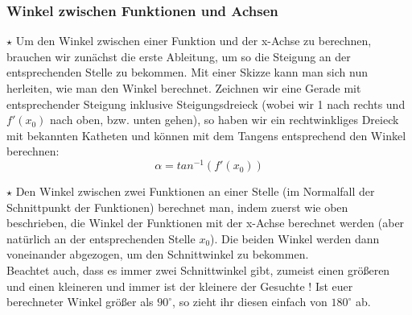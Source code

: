 	\subsubsection{Winkel zwischen Funktionen und Achsen}
		\(\star\) Um den Winkel zwischen einer Funktion und der x-Achse zu berechnen,
		brauchen wir zunächst die erste Ableitung, um so die Steigung an der
		entsprechenden Stelle zu bekommen. Mit einer Skizze kann man sich nun
		herleiten, wie man den Winkel berechnet. Zeichnen wir eine Gerade mit
		entsprechender Steigung inklusive Steigungsdreieck (wobei wir 1 nach rechts
		und \(f'(x_0)\) nach oben, bzw. unten gehen), so haben wir ein rechtwinkliges
		Dreieck mit bekannten Katheten und können mit dem Tangens entsprechend den
		Winkel berechnen:
		\[\alpha = tan^{-1}(f'(x_0))\]

		\(\star\) Den Winkel zwischen zwei Funktionen an einer Stelle (im Normalfall
		der Schnittpunkt der Funktionen) berechnet man, indem zuerst wie oben
		beschrieben, die Winkel der Funktionen mit der x-Achse berechnet werden (aber
		natürlich an der entsprechenden Stelle \(x_0\)). Die beiden Winkel werden dann
		voneinander abgezogen, um den Schnittwinkel zu bekommen.\\
		Beachtet auch, dass es immer zwei Schnittwinkel gibt, zumeist einen größeren
		und einen kleineren und immer ist  der kleinere der Gesuchte ! Ist euer
		berechneter Winkel größer als \(90^\circ\), so zieht ihr diesen einfach von
		\(180^\circ\) ab.
